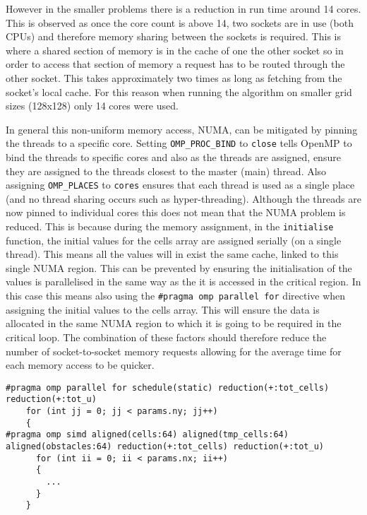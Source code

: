 \documentclass{article}
\begin{document}
\begin{multicols}{2}
However in the smaller problems there is a reduction in run time around 14
cores. This is observed as once the core count is above 14, two sockets are in
use (both CPUs) and therefore memory sharing between the sockets is required.
This is where a shared section of memory is in the cache of one the other
socket so in order to access that section of memory a request has to be routed
through the other socket. This takes approximately two times as long as
fetching from the socket's local cache. For this reason when running the
algorithm on smaller grid sizes 
(128x128) only 14 cores were used.

In general this non-uniform memory access, NUMA, can be mitigated by pinning 
the threads to a specific core. Setting \verb|OMP_PROC_BIND| to \verb|close|
tells OpenMP to bind the threads to specific cores and also as the threads are
assigned, ensure they are assigned to the threads closest to the master (main)
thread. Also assigning \verb|OMP_PLACES| to \verb|cores| ensures that each
thread is used as a single place (and no thread sharing occurs such as
hyper-threading). Although the threads are now pinned to individual cores this
does not mean that the NUMA problem is reduced. This is because during the
memory assignment, in the \verb|initialise| function, the initial values for the
cells array are assigned serially (on a single thread). This means all the
values will in exist the same cache, linked to this single NUMA region. This
can be prevented by ensuring the initialisation of the values is parallelised
in the same way as the it is accessed in the critical region. In this case this
means also using the \verb|#pragma omp parallel for| directive when assigning the initial
values to the cells array. This will ensure the data is allocated in the same
NUMA region to which it is going to be required in the critical loop. The
combination of these factors should therefore reduce the number of
socket-to-socket memory requests allowing for the average time for each memory
access to be quicker.  

\begin{lstlisting}[style=CStyle, label={lst:ompparallelloop}, caption={TODO},]
#pragma omp parallel for schedule(static) reduction(+:tot_cells) reduction(+:tot_u)
    for (int jj = 0; jj < params.ny; jj++)
    {    
#pragma omp simd aligned(cells:64) aligned(tmp_cells:64) aligned(obstacles:64) reduction(+:tot_cells) reduction(+:tot_u)
      for (int ii = 0; ii < params.nx; ii++)
      {
        ...
      }
    }
\end{lstlisting}


\end{multicols}
\end{document}
